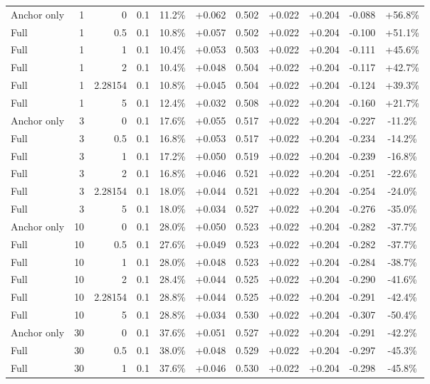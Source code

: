 \begin{table}[htbp]
\begin{tabular}{lrrrccccccc}
Anchor only & 1 & 0 & 0.1 & 11.2\% & +0.062 & 0.502 & +0.022 & +0.204 & -0.088 & +56.8\% \\
Full & 1 & 0.5 & 0.1 & 10.8\% & +0.057 & 0.502 & +0.022 & +0.204 & -0.100 & +51.1\% \\
Full & 1 & 1 & 0.1 & 10.4\% & +0.053 & 0.503 & +0.022 & +0.204 & -0.111 & +45.6\% \\
Full & 1 & 2 & 0.1 & 10.4\% & +0.048 & 0.504 & +0.022 & +0.204 & -0.117 & +42.7\% \\
Full & 1 & 2.28154 & 0.1 & 10.8\% & +0.045 & 0.504 & +0.022 & +0.204 & -0.124 & +39.3\% \\
Full & 1 & 5 & 0.1 & 12.4\% & +0.032 & 0.508 & +0.022 & +0.204 & -0.160 & +21.7\% \\
Anchor only & 3 & 0 & 0.1 & 17.6\% & +0.055 & 0.517 & +0.022 & +0.204 & -0.227 & -11.2\% \\
Full & 3 & 0.5 & 0.1 & 16.8\% & +0.053 & 0.517 & +0.022 & +0.204 & -0.234 & -14.2\% \\
Full & 3 & 1 & 0.1 & 17.2\% & +0.050 & 0.519 & +0.022 & +0.204 & -0.239 & -16.8\% \\
Full & 3 & 2 & 0.1 & 16.8\% & +0.046 & 0.521 & +0.022 & +0.204 & -0.251 & -22.6\% \\
Full & 3 & 2.28154 & 0.1 & 18.0\% & +0.044 & 0.521 & +0.022 & +0.204 & -0.254 & -24.0\% \\
Full & 3 & 5 & 0.1 & 18.0\% & +0.034 & 0.527 & +0.022 & +0.204 & -0.276 & -35.0\% \\
Anchor only & 10 & 0 & 0.1 & 28.0\% & +0.050 & 0.523 & +0.022 & +0.204 & -0.282 & -37.7\% \\
Full & 10 & 0.5 & 0.1 & 27.6\% & +0.049 & 0.523 & +0.022 & +0.204 & -0.282 & -37.7\% \\
Full & 10 & 1 & 0.1 & 28.0\% & +0.048 & 0.523 & +0.022 & +0.204 & -0.284 & -38.7\% \\
Full & 10 & 2 & 0.1 & 28.4\% & +0.044 & 0.525 & +0.022 & +0.204 & -0.290 & -41.6\% \\
Full & 10 & 2.28154 & 0.1 & 28.8\% & +0.044 & 0.525 & +0.022 & +0.204 & -0.291 & -42.4\% \\
Full & 10 & 5 & 0.1 & 28.8\% & +0.034 & 0.530 & +0.022 & +0.204 & -0.307 & -50.4\% \\
Anchor only & 30 & 0 & 0.1 & 37.6\% & +0.051 & 0.527 & +0.022 & +0.204 & -0.291 & -42.2\% \\
Full & 30 & 0.5 & 0.1 & 38.0\% & +0.048 & 0.529 & +0.022 & +0.204 & -0.297 & -45.3\% \\
Full & 30 & 1 & 0.1 & 37.6\% & +0.046 & 0.530 & +0.022 & +0.204 & -0.298 & -45.8\% \\

\end{tabular}
\end{table}
